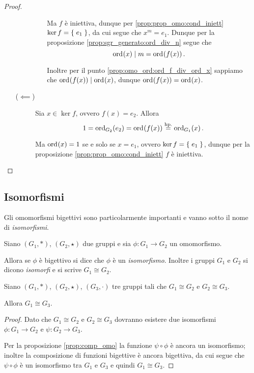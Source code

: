 \begin{proof}
\begin{enumerate}[label={(\roman*)}]
\begin{description}
\begin{itemize}
                Ma $f$ è iniettiva, dunque per \ref{prop:prop_omo:cond_iniett} $\ker f = \set{e_1}$, da cui segue che $x^m = e_1$. 
                Dunque per la proposizione \ref{prop:sgr_generato:ord_div_n} segue che \[
                    \ord x \divides m = \ord{f(x)}.    
                \]

                Inoltre per il punto \ref{prop:omo_ord:ord_f_div_ord_x} sappiamo che $\ord{f(x)} \divides \ord x$, dunque $\ord{f(x)} = \ord x$.
            \end{itemize} 
            \item[($\impliedby$)] Sia $x \in \ker f$, ovvero $f(x) = e_2$. Allora \[
                1 = \ord[G_2]{e_2} = \ord{f(x)} \stackrel{\text{hp.}}{=} \ord[G_1]{x}.
            \] 
            
            Ma $\ord x = 1$ se e solo se $x = e_1$, ovvero $\ker f = \set{e_1}$, dunque per la proposizione \ref{prop:prop_omo:cond_iniett} $f$ è iniettiva.
        \end{description}
    \end{enumerate}
\end{proof}

\subsection{Isomorfismi}

Gli omomorfismi bigettivi sono particolarmente importanti e vanno sotto il nome di \emph{isomorfismi}.

\begin{definition}
    [Isomorfismo] \label{def:isomorfismo}
    Siano $(G_1, *)$, $(G_2, \star)$ due gruppi e sia $\phi : G_1 \to G_2$ un omomorfismo.

    Allora se $\phi$ è bigettivo si dice che $\phi$ è un \emph{isomorfismo}. Inoltre i gruppi $G_1$ e $G_2$ si dicono \emph{isomorfi} e si scrive $G_1 \cong G_2$.
\end{definition}

\begin{corollary}\label{prop:trans_isomorf}
    Siano $(G_1, *)$, $(G_2, \star)$, $(G_3, \cdot)$ tre gruppi tali che $G_1 \cong G_2$ e $G_2 \cong G_3$.

    Allora $G_1 \cong G_3$.
\end{corollary}
\begin{proof}
    Dato che $G_1 \cong G_2$ e $G_2 \cong G_3$ dovranno esistere due isomorfismi $\phi : G_1 \to G_2$ e $\psi : G_2 \to G_3$.

    Per la proposizione \ref{prop:comp_omo} la funzione $\psi \circ \phi$ è ancora un isomorfismo; inoltre la composizione di funzioni bigettive è ancora bigettiva, da cui segue che $\psi \circ \phi$ è un isomorfismo tra $G_1$ e $G_3$ e quindi $G_1 \cong G_3$.
\end{proof}

